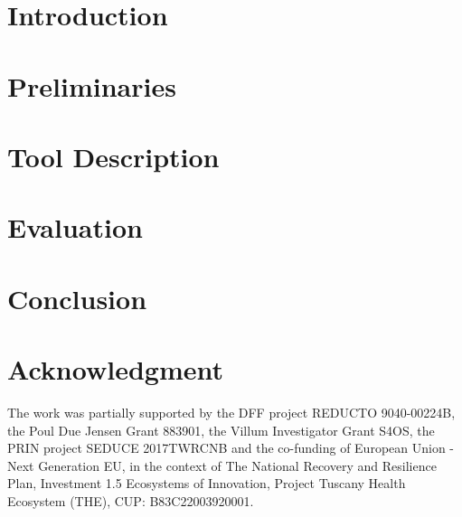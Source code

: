 \documentclass[a4paper,american]{llncs}
\begin{document}
\begin{abstract}
	
\end{abstract}



\section{Introduction}\label{sec_intro}




\section{Preliminaries}\label{sec_pre}




\section{Tool Description}\label{sec_desc}





\section{Evaluation}\label{sec_eval}





\section{Conclusion}\label{sec_conc}




\section*{Acknowledgment}
The work was partially supported by the DFF project REDUCTO 9040-00224B, the Poul Due Jensen Grant 883901, the Villum Investigator Grant S4OS, the PRIN project SEDUCE 2017TWRCNB and the co-funding of European Union - Next Generation EU, in the context of The National Recovery and Resilience Plan, Investment 1.5 Ecosystems of Innovation, Project Tuscany Health Ecosystem (THE), CUP: B83C22003920001.







\appendix
%

\end{document}

